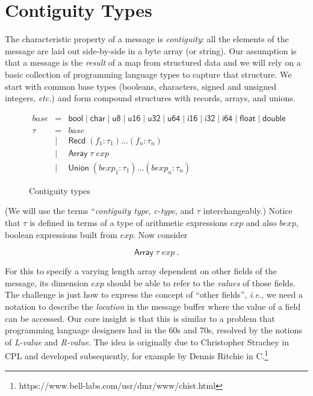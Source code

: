 \documentclass[svgnames]{llncs}
\newcommand{\ie}{\textit{i.e.}}
\newcommand{\etc}{\textit{etc.}}
\newcommand{\konst}[1]{\ensuremath{\mathsf{#1}}}
\begin{document}
\section {Contiguity Types}

The characteristic property of a message is \emph{contiguity}: all the
elements of the message are laid out side-by-side in a byte array (or
string). Our assumption is that a message is the \emph{result} of a
map from structured data and we will rely on a basic collection of
programming language types to capture that structure. We start with
common base types (booleans, characters, signed and unsigned integers,
\etc) and form compound structures with records, arrays, and unions.

\begin{figure}
\[
\begin{array}{rcl}
 \mathit{base} & = & \konst{bool} \mid \konst{char} \mid \konst{u8} \mid
 \konst{u16} \mid \konst{u32} \mid \konst{u64}  \mid \konst{i16} \mid
 \konst{i32} \mid \konst{i64} \mid \konst{float} \mid \konst{double} \\
 \tau & = & \mathit{base} \\
      & \mid & \konst{Recd}\; (f_1 : \tau_1) \ldots (f_n : \tau_n) \\
      & \mid & \konst{Array}\; \tau \; \mathit{exp} \\
      & \mid & \konst{Union}\; (\mathit{bexp}_1 : \tau_1) \ldots (\mathit{bexp}_n : \tau_n)
\end{array}
\]
\label{contig-types}
\caption{Contiguity types}
\end{figure}

\noindent (We will use the terms ``\emph{contiguity type},
\emph{c-type}, and $\tau$ interchangeably.) Notice that $\tau$ is
defined in terms of a type of arithmetic expressions $\mathit{exp}$
and also $\mathit{bexp}$, boolean expressions built from
$\mathit{exp}$. Now consider

\[
 \konst{Array} \; \tau \; \mathit{exp} \ .
\]

\noindent For this to specify a varying length array dependent on
other fields of the message, its dimension $\mathit{exp}$ should be
able to refer to the \emph{values} of those fields. The challenge is
just how to express the concept of ``other fields'', \ie, we need a
notation to describe the \emph{location} in the message buffer where
the value of a field can be accessed. Our core insight is that this is
similar to a problem that programming language designers had in the
60s and 70s, resolved by the notions of \emph{L-value} and
\emph{R-value}. The idea is originally due to Christopher Strachey in
CPL and developed subsequently, for example by Dennis Ritchie in
C.\footnote{https://www.bell-labs.com/usr/dmr/www/chist.html}
\end{document}
